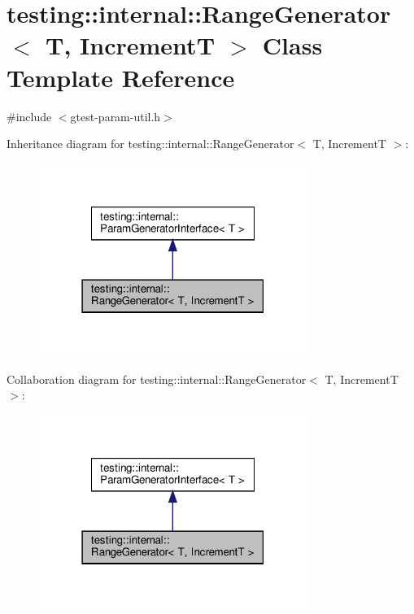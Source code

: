 \hypertarget{classtesting_1_1internal_1_1RangeGenerator}{}\section{testing\+:\+:internal\+:\+:Range\+Generator$<$ T, IncrementT $>$ Class Template Reference}
\label{classtesting_1_1internal_1_1RangeGenerator}


{\ttfamily \#include $<$gtest-\/param-\/util.\+h$>$}



Inheritance diagram for testing\+:\+:internal\+:\+:Range\+Generator$<$ T, IncrementT $>$\+:\nopagebreak
\begin{figure}[H]
\begin{center}
\leavevmode
\includegraphics[width=247pt]{classtesting_1_1internal_1_1RangeGenerator__inherit__graph}
\end{center}
\end{figure}


Collaboration diagram for testing\+:\+:internal\+:\+:Range\+Generator$<$ T, IncrementT $>$\+:\nopagebreak
\begin{figure}[H]
\begin{center}
\leavevmode
\includegraphics[width=247pt]{classtesting_1_1internal_1_1RangeGenerator__coll__graph}
\end{center}
\end{figure}
